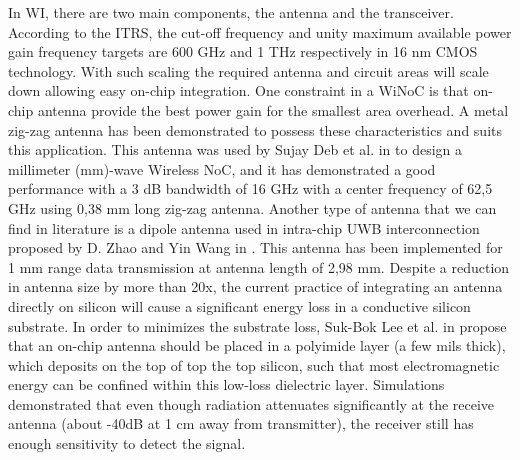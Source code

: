 \documentclass[12pt]{article}
\begin{document}
In WI, there are two main components, the antenna and the transceiver. According to the ITRS, the cut-off frequency and unity maximum available power gain frequency targets are 600 GHz and 1 THz respectively in 16 nm CMOS technology. With such scaling the required antenna and circuit areas will scale down allowing easy on-chip integration. One constraint in a WiNoC is that on-chip antenna provide the best power gain for the smallest area overhead. A metal zig-zag antenna has been demonstrated to possess these characteristics and suits this application. This antenna was used by Sujay Deb et al. in \citep{5540799} to design a millimeter (mm)-wave Wireless NoC, and it has demonstrated a good performance with a 3 dB bandwidth of 16 GHz with a center frequency of 62,5 GHz using 0,38 mm long zig-zag antenna. Another type of antenna that we can find in literature is a dipole antenna used in intra-chip UWB interconnection proposed by D. Zhao and Yin Wang in \citep{4531729}. This antenna has been implemented for 1 mm range data transmission at antenna length of 2,98 mm. Despite a reduction in antenna size by more than 20x, the current practice of integrating an antenna directly on silicon will cause a significant energy loss in a conductive silicon substrate. In order to minimizes the substrate loss, Suk-Bok Lee et al. in \citep {lee2009scalable} propose that an on-chip antenna should be placed in a polyimide layer (a few mils thick), which deposits on the top of top the top silicon, such that most electromagnetic energy can be confined within this low-loss dielectric layer. Simulations demonstrated that even though radiation attenuates significantly at the receive antenna (about -40dB at 1 cm away from transmitter), the receiver still has enough sensitivity to detect the signal.
\end{document}
